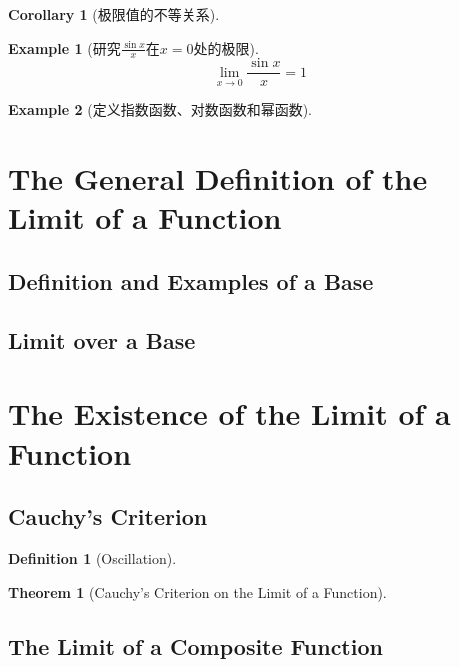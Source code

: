 \documentclass[onecolumn]{ctexart}
\newtheorem{definition}{Definition}
\newtheorem{theorem}{Theorem}
\newtheorem{corollary}{Corollary}
\newtheorem{example}{Example}
\begin{document}
\begin{corollary}[极限值的不等关系]
  
\end{corollary}

\begin{example}[研究$\frac{\sin x}{x}$在$x=0$处的极限]
  \begin{equation}
    \lim_{x \to 0} \frac{\sin x}{x} = 1
  \end{equation}
\end{example}

\begin{example}[定义指数函数、对数函数和幂函数]
  
\end{example}

\section{The General Definition of the Limit of a Function}

\subsection{Definition and Examples of a Base}

\subsection{Limit over a Base}

\section{The Existence of the Limit of a Function}

\subsection{Cauchy's Criterion}

\begin{definition}[Oscillation]
  
\end{definition}

\begin{theorem}[Cauchy's Criterion on the Limit of a Function]
  
\end{theorem}

\subsection{The Limit of a Composite Function}
\end{document}
